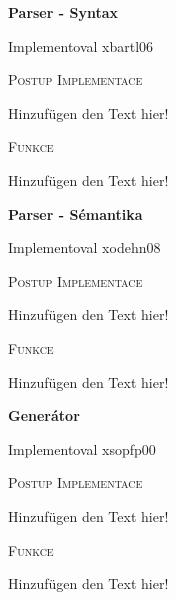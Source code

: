 \documentclass[12pt,a4paper]{report}
\begin{document}
    {\huge\bfseries Parser - Syntax \par}
    Implementoval xbartl06
    \vspace{1cm}

    {\scshape\Large Postup Implementace\par}
    \vspace{0.3cm}
    \noindent Hinzufügen den Text hier!
    \vspace{1cm}

    {\scshape\Large Funkce\par}
    \vspace{0.3cm}
    \noindent Hinzufügen den Text hier!
    \newpage



    {\huge\bfseries Parser - Sémantika \par}
    Implementoval xodehn08
    \vspace{1cm}

    {\scshape\Large Postup Implementace\par}
    \vspace{0.3cm}
    \noindent Hinzufügen den Text hier!
    \vspace{1cm}

    {\scshape\Large Funkce\par}
    \vspace{0.3cm}
    \noindent Hinzufügen den Text hier!
    \newpage



    {\huge\bfseries Generátor \par}
    Implementoval xsopfp00
    \vspace{1cm}

    {\scshape\Large Postup Implementace\par}
    \vspace{0.3cm}
    \noindent Hinzufügen den Text hier!
    \vspace{1cm}

    {\scshape\Large Funkce\par}
    \vspace{0.3cm}
    \noindent Hinzufügen den Text hier!
    \newpage
\end{document}
